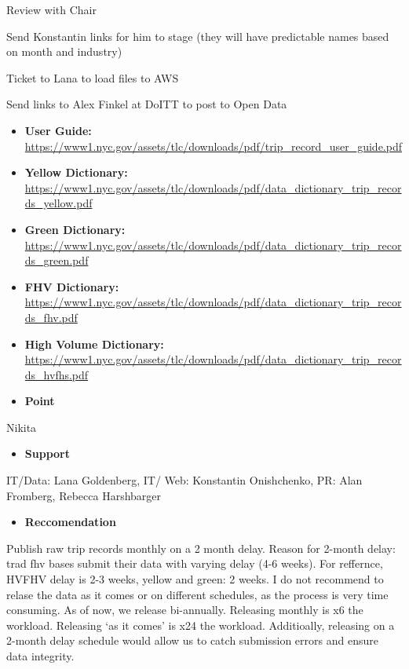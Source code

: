\documentclass[
]{book}
\providecommand{\tightlist}{%
  \setlength{\itemsep}{0pt}\setlength{\parskip}{0pt}}
\begin{document}
Review with Chair

Send Konstantin links for him to stage (they will have predictable names based on month and industry)

Ticket to Lana to load files to AWS

Send links to Alex Finkel at DoITT to post to Open Data

\begin{itemize}
\item
  \textbf{User Guide:}
  \url{https://www1.nyc.gov/assets/tlc/downloads/pdf/trip_record_user_guide.pdf}
\item
  \textbf{Yellow Dictionary:}
  \url{https://www1.nyc.gov/assets/tlc/downloads/pdf/data_dictionary_trip_records_yellow.pdf}\\
\item
  \textbf{Green Dictionary:}
  \url{https://www1.nyc.gov/assets/tlc/downloads/pdf/data_dictionary_trip_records_green.pdf}\\
\item
  \textbf{FHV Dictionary:}
  \url{https://www1.nyc.gov/assets/tlc/downloads/pdf/data_dictionary_trip_records_fhv.pdf}\\
\item
  \textbf{High Volume Dictionary:}
  \url{https://www1.nyc.gov/assets/tlc/downloads/pdf/data_dictionary_trip_records_hvfhs.pdf}
\item
  \textbf{Point}
\end{itemize}

Nikita

\begin{itemize}
\tightlist
\item
  \textbf{Support}
\end{itemize}

IT/Data: Lana Goldenberg, IT/ Web: Konstantin Onishchenko, PR: Alan Fromberg, Rebecca Harshbarger

\begin{itemize}
\tightlist
\item
  \textbf{Reccomendation}
\end{itemize}

Publish raw trip records monthly on a 2 month delay. Reason for 2-month delay: trad fhv bases submit their data with varying delay (4-6 weeks). For reffernce, HVFHV delay is 2-3 weeks, yellow and green: 2 weeks. I do not recommend to relase the data as it comes or on different schedules, as the process is very time consuming. As of now, we release bi-annually. Releasing monthly is x6 the workload. Releasing `as it comes' is x24 the workload. Additioally, releasing on a 2-month delay schedule would allow us to catch submission errors and ensure data integrity.
\end{document}
